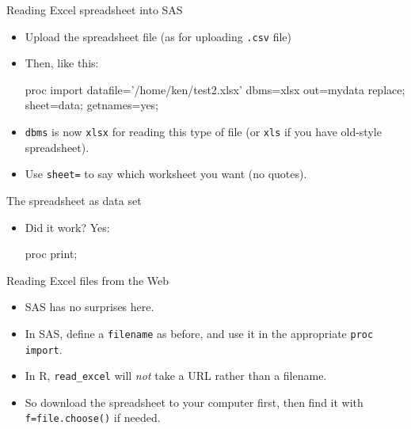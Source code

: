 \documentclass[unknownkeysallowed]{beamer}\usepackage[]{graphicx}\usepackage[]{color}
\begin{document}
\begin{frame}[fragile]{Reading Excel spreadsheet into SAS}
  
  \begin{itemize}
  \item Upload the spreadsheet file (as for uploading \texttt{.csv}
    file)
  \item Then, like this:
    
    \begin{Datastep}
proc import 
  datafile='/home/ken/test2.xlsx'
  dbms=xlsx
  out=mydata
  replace;
  sheet=data;
  getnames=yes;
    \end{Datastep}
    
    
  \item \texttt{dbms} is now \texttt{xlsx} for reading this type of
    file (or \texttt{xls} if you have old-style spreadsheet).
  \item Use \texttt{sheet=} to say which worksheet you want (no quotes).
    
  \end{itemize}
  
\end{frame}

\begin{frame}[fragile]{The spreadsheet as data set}

  
  \begin{itemize}
  \item Did it work? Yes:

    \begin{Sascode}[store=re]
proc print;    
  \end{Sascode}
  


  \end{itemize}
  
  
\end{frame}

\begin{frame}[fragile]{Reading Excel files from the Web}
  
  \begin{itemize}
  \item SAS has no surprises here.
  \item In SAS, define a \texttt{filename} as before, and use it in
    the appropriate \texttt{proc import}.
  \item In R, \texttt{read\_excel} will \emph{not} take a URL rather
    than a filename. 
  \item So download the spreadsheet to your computer
    first, then find it with \texttt{f=file.choose()} if needed.
  \end{itemize}
  
\end{frame}
\end{document}

